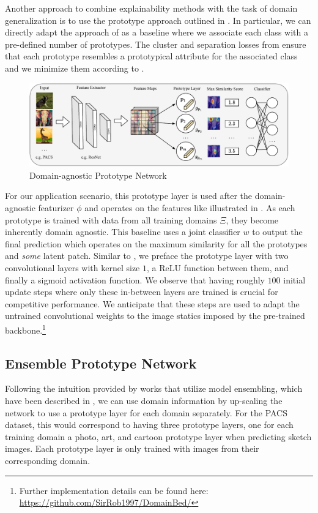 Another approach to combine explainability methods with the task of domain generalization is to use the prototype approach outlined in . In particular, we can directly adapt the approach of \citet{ChenLTBRS19} as a baseline where we associate each class with a pre-defined number of prototypes. The cluster and separation losses from  ensure that each prototype resembles a prototypical attribute for the associated class and we minimize them according to .

\begin{figure}[t]
    \centering
    \includegraphics[width=\textwidth]{Figures/Chapter4/prototype_agnostic-cropped.pdf}
    \caption{Domain-agnostic Prototype Network}
    \label{fig:domain_prototype_network}
\end{figure}

For our application scenario, this prototype layer is used after the domain-agnostic featurizer $\phi$ and operates on the features like illustrated in . As each prototype is trained with data from all training domains $\Xi$, they become inherently domain agnostic. This baseline uses a joint classifier $w$ to output the final prediction which operates on the maximum similarity for all the prototypes and \emph{some} latent patch. Similar to \citet{ChenLTBRS19}, we preface the prototype layer with two convolutional layers with kernel size $1$, a ReLU function between them, and finally a sigmoid activation function. We observe that having roughly $100$ initial update steps where only these in-between layers are trained is crucial for competitive performance. We anticipate that these steps are used to adapt the untrained convolutional weights to the image statics imposed by the pre-trained backbone.\footnote{Further implementation details can be found here: \url{https://github.com/SirRob1997/DomainBed/}}


\subsection{Ensemble Prototype Network}
Following the intuition provided by works that utilize model ensembling, which have been described in , we can use domain information by up-scaling the network to use a prototype layer for each domain separately. For the PACS dataset, this would correspond to having three prototype layers, one for each training domain \eg a photo, art, and cartoon prototype layer when predicting sketch images. Each prototype layer is only trained with images from their corresponding domain.

